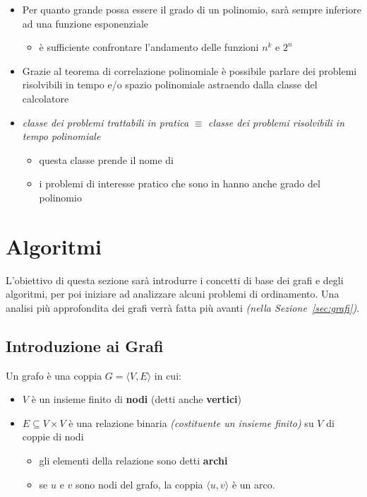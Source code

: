 \documentclass[italian, 10pt]{article}
\begin{document}
\begin{itemize}
  \item Per quanto grande possa essere il grado di un polinomio, sarà sempre inferiore ad una funzione esponenziale
        \begin{itemize}[label=\(\rightarrow\)]
          \item è sufficiente confrontare l'andamento delle funzioni \(n^k\) e \(2^n\)
        \end{itemize}
  \item Grazie al teorema di correlazione polinomiale è possibile parlare dei problemi risolvibili in tempo e/o spazio polinomiale astraendo dalla classe del calcolatore
  \item \textit{classe dei problemi trattabili in pratica} \(\equiv\) \textit{classe dei problemi risolvibili in tempo polinomiale}
        \begin{itemize}
          \item questa classe prende il nome di \Pset
          \item i problemi di interesse pratico che sono in \Pset hanno anche grado del polinomio 
        \end{itemize}
\end{itemize}

\clearpage

\section{Algoritmi}

L'obiettivo di questa sezione sarà introdurre i concetti di base dei grafi e degli algoritmi, per poi iniziare ad analizzare alcuni problemi di ordinamento.
Una analisi più approfondita dei grafi verrà fatta più avanti \textit{(nella Sezione~\ref{sec:grafi})}.

\subsection{Introduzione ai Grafi}

Un grafo è una coppia \(G = \langle V, E \rangle\) in cui:

\begin{itemize}
  \item \(V\) è un insieme finito di \textbf{nodi} (detti anche \textbf{vertici})
  \item \(E \subseteq V \times V\) è una relazione binaria \textit{(costituente un insieme finito)} su \(V\) di coppie di nodi
        \begin{itemize}
          \item gli elementi della relazione sono detti \textbf{archi}
          \item se \(u\) e \(v\) sono nodi del grafo, la coppia \(\langle u, v \rangle\) è un arco.
        \end{itemize}
\end{itemize}
\end{document}

